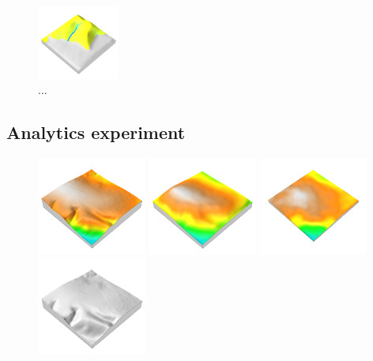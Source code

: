 \documentclass[prodmode,acmtochi]{acmsmall} %
\begin{document}
\begin{figure}[h!]
\begin{center}
		\includegraphics[width=0.24\textwidth]{images/render_3d/mean_depth_3.png}
	\caption{...}
	\label{fig:}
\end{center}
\end{figure}


\subsection{Analytics experiment}

\begin{figure}[h!]
\begin{center}
		\includegraphics[width=0.32\textwidth]{images/render_3d/dem_4.png}
		\includegraphics[width=0.32\textwidth]{images/render_3d/mean_dem_4.png}
		\includegraphics[width=0.32\textwidth]{images/render_3d/stdev_dem_4.png}
		\includegraphics[width=0.32\textwidth]{images/render_3d/dem_difference_4.png}

\end{center}
\end{figure}
\end{document}
